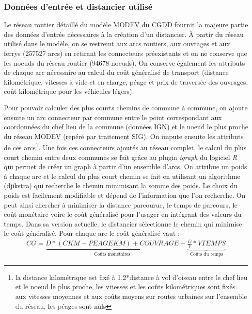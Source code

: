 \documentclass[10.5pt,a4paper]{article}
\begin{document}
{\subsubsection{Données d'entrée et distancier utilisé}

Le réseau routier détaillé du modèle MODEV du CGDD \citep{Pochez_etal16} fournit la majeure partie des données d'entrée nécessaires à la création d'un distancier. \`{A} partir du réseau utilisé dans le modèle, on se restreint aux arcs routiers, aux ouvrages et aux ferrys (257527 arcs) en retirant les connecteurs préexistants et on ne conserve que les noeuds du réseau routier (94678 noeuds). On conserve également les attributs de chaque arc nécessaire au calcul du coût généralisé de transport (distance kilométrique, vitesses à vide et en charge, péage et prix de traversée des ouvrages, coût kilométrique pour les véhicules légers). \par 

Pour pouvoir calculer des plus courts chemins de commune à commune, on ajoute ensuite un arc connecteur par commune entre le point correspondant aux coordonnées du chef lieu de la commune (données IGN) et le noeud le plus proche du réseau MODEV (repéré par traitement SIG). On impute ensuite les attributs de ces arcs\footnote{la distance kilométrique est fixé à 1.2*distance à vol d'oiseau entre le chef lieu et le noeud le plus proche, les vitesses et les coûts kilométriques sont fixés aux vitesses moyennes et aux coûts moyens sur routes urbaines sur l'ensemble du réseau, les péages sont nuls}. Une fois ces connecteurs ajoutés au réseau complet, le calcul du plus court chemin entre deux communes se fait grâce au plugin \textit{igraph} du logiciel \textit{R} qui permet de créer  un graph à partir d'un ensemble d'arcs. On attribue un poids à chaque arc et le calcul du plus court chemin se fait en utilisant un algorithme (djikstra) qui recherche le chemin minimisant la somme des poids. Le choix du poids est facilement modifiable et dépend de l'information que l'on recherche. On peut ainsi chercher à minimiser la distance parcourue, le temps de parcours, le coût monétaire voire le coût généralisé pour l'usager en intégrant des valeurs du temps. Dans sa version actuelle, le distancier sélectionne le chemin qui minimise le coût généralisé. Pour chaque arc le coût généralisé vaut :
\begin{eqnarray*}
CG = \underbrace{D  * (CKM + PEAGEKM) + COUVRAGE}_{\text{Coûts monétaires}} + 
\underbrace{\frac{D}{V} * VTEMPS}_{\text{Coûts du temps}}
\end{eqnarray*}       

}
\end{document}
